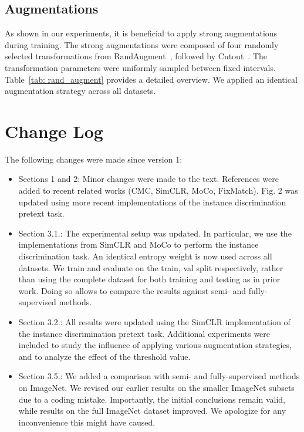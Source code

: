 \documentclass[runningheads]{llncs}
\begin{document}
\subsection{Augmentations}
As shown in our experiments, it is beneficial to apply strong augmentations during training. The strong augmentations were composed of four randomly selected transformations from RandAugment~\cite{cubuk2020randaugment}, followed by Cutout~\cite{devries2017improved}. The transformation parameters were uniformly sampled between fixed intervals. Table~\ref{tab: rand_augment} provides a detailed overview. We applied an identical augmentation strategy across all datasets. 
 \newpage
\section{Change Log}
The following changes were made since version 1:
\begin{itemize}
    \item Sections 1 and 2: Minor changes were made to the text. References were added to recent related works (CMC, SimCLR, MoCo, FixMatch). Fig. 2 was updated using more recent implementations of the instance discrimination pretext task. 
    \item Section 3.1.: The experimental setup was updated. In particular, we use the implementations from SimCLR and MoCo to perform the instance discrimination task. An identical entropy weight is now used across all datasets. We train and evaluate on the train, val split respectively, rather than using the complete dataset for both training and testing as in prior work. Doing so allows to compare the results against semi- and fully-supervised methods.
    \item Section 3.2.: All results were updated using the SimCLR implementation of the instance discrimination pretext task. Additional experiments were included to study the influence of applying various augmentation strategies, and to analyze the effect of the threshold value.
    \item Section 3.5.: We added a comparison with semi- and fully-supervised methods on ImageNet. We revised our earlier results on the smaller ImageNet subsets due to a coding mistake. Importantly, the initial conclusions remain valid, while results on the full ImageNet dataset improved. We apologize for any inconvenience this might have caused. 
\end{itemize} 
\end{document}
